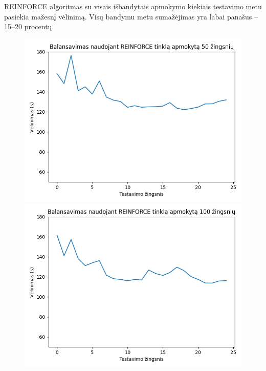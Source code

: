 \documentclass{VUMIFPSbakalaurinis}
\begin{document}
REINFORCE algoritmas su visais išbandytais apmokymo kiekiais testavimo metu pasiekia mažesnį vėlinimą. Visų bandymu metu sumažėjimas yra labai panašus – 15–20 procentų.
\begin{figure}[h!]
    \centering
    \begin{minipage}[b]{0.45\textwidth}
        \includegraphics[width=\textwidth]{img/reinforce_50_2.png}
    \end{minipage}
    \hspace{1mm}
    \begin{minipage}[b]{0.45\textwidth}
        \includegraphics[width=\textwidth]{img/reinforce_100_2.png}
    \end{minipage}
    \hspace{1mm}

\end{figure}
\end{document}
